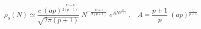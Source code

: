 \begin{equation}\label{rhoo}
\rho_o(N) \simeq \frac{c \; (a p)^{\frac{D - p}{2 (p + 1)}}}
{\sqrt{2 \pi (p + 1)}} \; 
N^{- \frac{D + 1}{2 (p + 1)}} \; 
e^{A N^{\frac{p}{p + 1}}} \; , \; \; \; 
A = \frac{p + 1}{p} \; (a p)^{\frac{1}{p + 1}} 
\end{equation}


